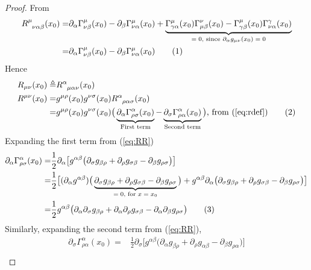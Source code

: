 \documentclass[]{article}
\newcommand\numberthis{\addtocounter{equation}{1}\tag{\theequation}}
\begin{document}
\begin{proof}
	From \cite[(53)]{akhmedev2016}
	\begin{align*}
	R\indices{^{\mu}_{\nu\alpha\beta}}(x_0) =& \partial_{\alpha}\Gamma^{\mu}_{\nu\beta}(x_0) - \partial_{\beta}\Gamma^{\mu}_{\nu\alpha}(x_0) + \underbrace{\Gamma^{\mu}_{\gamma\alpha}(x_0)\Gamma^{\nu}_{\mu\beta}(x_0)-\Gamma^{\mu}_{\gamma\beta}(x_0) \Gamma^{\gamma}_{\nu\alpha}(x_0)}_\text{$=0$, since $\partial_{\alpha}g_{\mu\nu}(x_0)=0$}\\
	=& \partial_{\alpha}\Gamma^{\mu}_{\nu\beta}(x_0) - \partial_{\beta}\Gamma^{\mu}_{\nu\alpha}(x_0) \numberthis\label{eq:rdef}
	\end{align*}
	Hence
	\begin{align*}
	R_{\mu\nu}(x_0) \triangleq&R\indices{^{\alpha}_{\mu\alpha\nu}}(x_0)\\
	R^{\mu\nu}(x_0)=& g^{\mu\rho}(x_0)g^{\nu\sigma}(x_0) R\indices{^{\alpha}_{\rho\alpha\sigma}}(x_0)\\
	=&g^{\mu\rho}(x_0)g^{\nu\sigma}(x_0)\big(\underbrace{\partial_{\alpha}\Gamma^{\alpha}_{\rho\sigma}(x_0)}_\text{First term} -\underbrace{ \partial_{\sigma}\Gamma^{\alpha}_{\rho\alpha}(x_0)}_\text{Second term} \big) \text{, from (\ref{eq:rdef})} \numberthis\label{eq:RR}
	\end{align*}
	Expanding the first term from (\ref{eq:RR})
	\begin{align*}
	\partial_{\alpha}\Gamma^{\alpha}_{\rho\sigma}(x_0) =& \frac{1}{2}\partial_{\alpha}\big[g^{\alpha\beta}\big(\partial_{\sigma}g_{\beta\rho} + \partial_{\rho} g_{\sigma\beta} - \partial_{\beta} g_{\rho\sigma}\big)\big]\\
	 =& \frac{1}{2}\big[ (\partial_{\alpha}g^{\alpha\beta})\big(\underbrace{\partial_{\sigma}g_{\beta\rho} + \partial_{\rho} g_{\sigma\beta} - \partial_{\beta}g_{\rho\sigma}}_\text{$=0$, for $x=x_0$}\big) + g^{\alpha\beta}\partial_{\alpha}\big(\partial_{\sigma}g_{\beta\rho} + \partial_{\rho} g_{\sigma\beta} - \partial_{\beta}g_{\rho\sigma}\big) \big]\\
	 =& \frac{1}{2} g^{\alpha\beta}\big(\partial_{\alpha}\partial_{\sigma}g_{\beta\rho} + \partial_{\alpha}\partial_{\rho} g_{\sigma\beta} - \partial_{\alpha}\partial_{\beta}g_{\rho\sigma}\big) \numberthis\label{eq:D1}
	 \end{align*}
	 Similarly, expanding the second term from (\ref{eq:RR}),
	 \begin{align*} \partial_{\sigma}\Gamma^{\alpha}_{\rho\alpha}(x_0) =& \frac{1}{2}\partial_{\sigma}\big[g^{\alpha\beta}\big(\partial_{\alpha}g_{\beta\rho} + \partial_{\rho}g_{\alpha\beta} - \partial_{\beta}g_{\rho\alpha}\big)\big]\\

\end{align*}
\end{proof}
\end{document}
